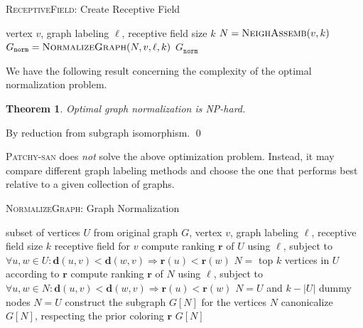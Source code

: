 \documentclass{article}
\newtheorem{thmx}{Theorem}
\renewenvironment{proof}{{\bf Proof:}}{\qed}
\newcommand{\patchysan}{{\textsc{Patchy-san}}\xspace}
\begin{document}
\begin{algorithm}[t!]
  \small
   \caption{\textsc{ReceptiveField}: Create Receptive Field}
   \label{alg:example}
\begin{algorithmic}[1]
	 vertex $v$, graph labeling $\ell$, receptive field size $k$
   \STATE $N = \textsc{NeighAssemb}(v, k)$
   \STATE $G_{\mathtt{norm}} = \textsc{NormalizeGraph}(N, v, \ell, k)$
    $G_{\mathtt{norm}}$
\end{algorithmic}
\end{algorithm}

We have the following result concerning the complexity of the optimal normalization problem. 
\begin{thmx} \label{thm:normalization_NP}
  Optimal graph normalization is NP-hard.
\end{thmx}
\begin{proof}
By reduction from subgraph isomorphism.
\end{proof}

\patchysan does \emph{not} solve the above optimization problem. Instead, it may compare different graph labeling methods and choose the one that performs best relative to a given collection of graphs.



\begin{algorithm}[t!]
   \small
   \caption{\textsc{NormalizeGraph}: Graph Normalization}
   \label{alg:normalization}
\begin{algorithmic}[1]
    subset of vertices $U$ from original graph $G$, vertex $v$, graph labeling $\ell$, receptive field size $k$
     receptive field for $v$
\STATE compute ranking $\mathbf{r}$ of $U$ using $\ell$, subject to \\  $\forall u,w \in U: \mathbf{d}(u,v) < \mathbf{d}(w,v) \Rightarrow \mathbf{r}(u)<\mathbf{r}(w)$
   \STATE $N = $ top $k$ vertices in $U$ according to $\mathbf{r}$
   \STATE compute ranking $\mathbf{r}$ of $N$ using $\ell$, subject to \\ $\forall u,w \in N: \mathbf{d}(u,v) < \mathbf{d}(w,v) \Rightarrow \mathbf{r}(u)<\mathbf{r}(w)$ 
   \STATE $N = U$ and $k-|U|$ dummy nodes
   \ELSE 
   \STATE $N = U$
   \ENDIF
   \STATE construct the subgraph $G[N]$ for the vertices $N$
   \STATE canonicalize $G[N]$, respecting the prior coloring $\mathbf{r}$
     $G[N]$
\end{algorithmic}
\end{algorithm}
\end{document}
